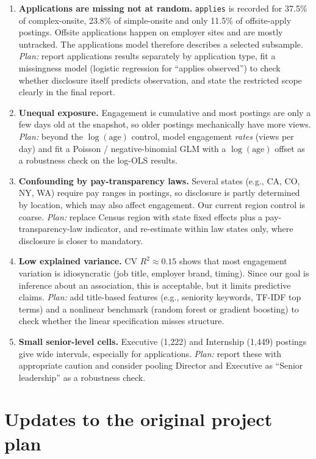\documentclass{article}
\begin{document}
\begin{enumerate}
  \item \textbf{Applications are missing not at random.} \texttt{applies} is recorded for 37.5\% of complex-onsite, 23.8\% of simple-onsite and only 11.5\% of offsite-apply postings. Offsite applications happen on employer sites and are mostly untracked. The applications model therefore describes a selected subsample. \emph{Plan:} report applications results separately by application type, fit a missingness model (logistic regression for ``applies observed'') to check whether disclosure itself predicts observation, and state the restricted scope clearly in the final report.
  \item \textbf{Unequal exposure.} Engagement is cumulative and most postings are only a few days old at the snapshot, so older postings mechanically have more views. \emph{Plan:} beyond the $\log(\text{age})$ control, model engagement \emph{rates} (views per day) and fit a Poisson / negative-binomial GLM with a $\log(\text{age})$ offset as a robustness check on the log-OLS results.
  \item \textbf{Confounding by pay-transparency laws.} Several states (e.g., CA, CO, NY, WA) require pay ranges in postings, so disclosure is partly determined by location, which may also affect engagement. Our current region control is coarse. \emph{Plan:} replace Census region with state fixed effects plus a pay-transparency-law indicator, and re-estimate within law states only, where disclosure is closer to mandatory.
  \item \textbf{Low explained variance.} CV $R^2\approx0.15$ shows that most engagement variation is idiosyncratic (job title, employer brand, timing). Since our goal is inference about an association, this is acceptable, but it limits predictive claims. \emph{Plan:} add title-based features (e.g., seniority keywords, TF-IDF top terms) and a nonlinear benchmark (random forest or gradient boosting) to check whether the linear specification misses structure.
  \item \textbf{Small senior-level cells.} Executive (1,222) and Internship (1,449) postings give wide intervals, especially for applications. \emph{Plan:} report these with appropriate caution and consider pooling Director and Executive as ``Senior leadership'' as a robustness check.
\end{enumerate}

\section{Updates to the original project plan}
\label{sec:updates}
\end{document}
